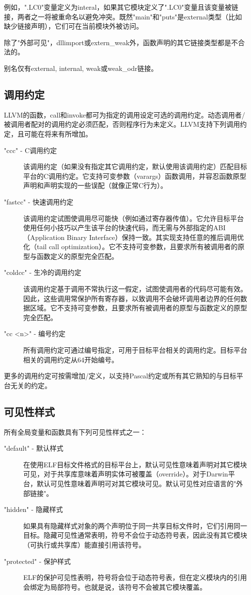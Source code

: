 \documentclass[12pt,a4paper]{article}
\begin{document}
例如，".LC0"变量定义为interal，如果其它模块定义了".LC0"变量且该变量被链接，两者之一将被重命名以避免冲突。既然"main"和"puts"是external类型（比如缺少链接声明），它们可在当前模块外被访问。

除了"外部可见"，dllimport或extern\_weak外，函数声明的其它链接类型都是不合法的。

别名仅有external, internal, weak或weak\_odr链接。

\subsection{调用约定}

LLVM的函数，call和invoke都可为指定的调用设定可选的调用约定。动态调用者/被调用者配对的调用约定必须匹配，否则程序行为未定义。LLVM支持下列调用约定，且可能在将来有所增加。

\begin{description}
\item["ccc" - C调用约定] 该调用约定（如果没有指定其它调用约定，默认使用该调用约定）匹配目标平台的C调用约定。它支持可变参数（varargs）函数调用，并容忍函数原型声明和声明实现的一些误配（就像正常C行为）。
\item["fastcc" - 快速调用约定] 该调用约定试图使调用尽可能快（例如通过寄存器传值）。它允许目标平台使用任何小技巧以产生该平台的快速代码，而无需与外部指定的ABI（Application Binary Interface）保持一致。其实现支持任意的推后调用优化（tail call optimization）。它不支持可变参数，且要求所有被调用者的原型与函数定义的原型完全匹配。
\item["coldcc" - 生冷的调用约定] 该调用约定基于调用不常执行这一假定，试图使调用者的代码尽可能有效。因此，这些调用常保护所有寄存器，以致调用不会破坏调用者边界的任何数据区域。它不支持可变参数，且要求所有被调用者的原型与函数定义的原型完全匹配。
\item["cc <n>" - 编号约定] 所有调用约定可通过编号指定，可用于目标平台相关的调用约定。目标平台相关的调用约定从64开始编号。
\end{description}

更多的调用约定可按需增加/定义，以支持Pascal约定或所有其它熟知的与目标平台无关的约定。

\subsection{可见性样式}

所有全局变量和函数具有下列可见性样式之一：

\begin{description}
\item["default" - 默认样式] 在使用ELF目标文件格式的目标平台上，默认可见性意味着声明对其它模块可见，对于共享库意味着声明实体可被覆盖（override）。对于Darwin平台，默认可见性意味着声明可对其它模块可见。默认可见性对应语言的"外部链接"。
\item["hidden" - 隐藏样式] 如果具有隐藏样式对象的两个声明位于同一共享目标文件时，它们引用同一目标。隐藏可见性通常表明，符号不会位于动态符号表，因此没有其它模块（可执行或共享库）能直接引用该符号。
\item["protected" - 保护样式] ELF的保护可见性表明，符号将会位于动态符号表，但在定义模块内的引用会绑定为局部符号。也就是说，该符号不会被其它模块覆盖。
\end{description}
\end{document}
